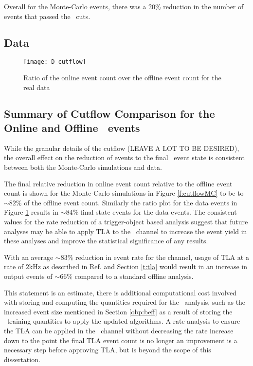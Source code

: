 	Overall for the Monte-Carlo events, there was a 20\% reduction in the number of events that passed the \VBFHBB\, cuts.




	\subsection{Data}
		\begin{figure}[h]
			\centering
			\texttt{[image: D\_cutflow]}
			\caption[\VBFHBB\ Cutflow ratio for data]{Ratio of the online event count over the offline event count for the real data}
			\label{f:cutflowD}
		\end{figure}


	\subsection{Summary of Cutflow Comparison for the Online and Offline \VBFHBB\ events}

	While the granular details of the cutflow (LEAVE A LOT TO BE DESIRED), the overall effect on the reduction of events to the final \VBFHBB\ event state is consistent between both the Monte-Carlo simulations and data.

	The final relative reduction in online event count relative to the offline event count is shown for the Monte-Carlo simulations in Figure \ref{f:cutflowMC} to be to $\sim82\%$ of the offline event count. Similarly the ratio plot for the data events in Figure \ref{f:cutflowD} results in $\sim84\%$ final state events for the data events. The consistent values for the rate reduction of a trigger-object based analysis suggest that future analyses may be able to apply TLA to the \VBFHBB\ channel to increase the event yield in these analyses and improve the statistical significance of any results.

	With an average $\sim83\%$ reduction in event rate for the channel, usage of TLA at a rate of $2$kHz as described in Ref. \cite{TLA} and Section \ref{t:tla} would result in an increase in output events of $\sim66\%$ compared to a standard offline analysis.

	This statement is an estimate, there is additional computational cost involved with storing and computing the quantities required for the \VBFHBB\ analysis, such as the increased event size mentioned in Section \ref{obp:beff} as a result of storing the \btag\ training quantities to apply the updated algorithms. A rate analysis to ensure the TLA can be applied in the \VBFHBB\ channel without decreasing the rate increase down to the point the final TLA event count is no longer an improvement is a necessary step before approving TLA, but is beyond the scope of this dissertation.


